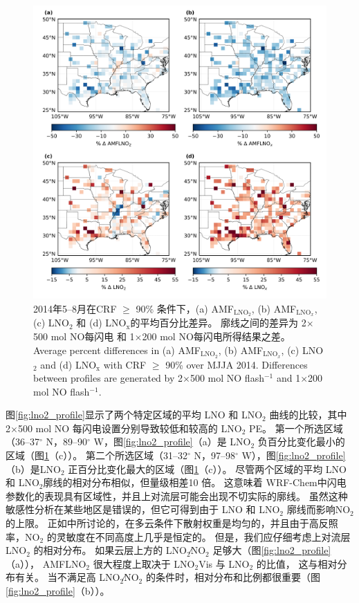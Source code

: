 \begin{figure}[t]
\centering
\includegraphics[width=13cm]{./figures/simulation_diff.png}
\caption{2014年5--8月在CRF $\geq$ 90\% 条件下，(a) AMF$_{\textrm{LNO$_2$}}$, (b) AMF$_{\textrm{LNO$_x$}}$, (c) LNO$_\textrm{2}$ 和 (d) LNO$_\textrm{x}$的平均百分比差异。
廓线之间的差异为 2$\times$500 mol NO每闪电 和 1$\times$200 mol NO每闪电所得结果之差。\\
Average percent differences in (a) AMF$_{\textrm{LNO$_2$}}$, (b) AMF$_{\textrm{LNO$_x$}}$, (c) LNO$_\textrm{2}$ and (d) LNO$_\textrm{x}$ with CRF $\geq$ 90\% over MJJA 2014.
Differences between profiles are generated by 2$\times$500 mol NO flash$^{-1}$ and 1$\times$200 mol NO flash$^{-1}$.}
\label{fig:simulation_diff}
\end{figure}

图\ref{fig:lno2_profile}显示了两个特定区域的平均 LNO 和 LNO$_2$ 曲线的比较，其中 2$\times$500 mol NO 每闪电设置分别导致较低和较高的 LNO$_2$ PE。
第一个所选区域（36--37$^{\circ}$ N，89--90$^{\circ}$ W，图\ref{fig:lno2_profile}（a）是 LNO$_2$ 负百分比变化最小的区域（图\ref{fig:simulation_diff}（c））。
第二个所选区域（31--32$^{\circ}$ N，97--98$^{\circ}$ W），图\ref{fig:lno2_profile}（b）是LNO$_2$ 正百分比变化最大的区域（图\ref{fig:simulation_diff}（c））。
尽管两个区域的平均 LNO 和 LNO$_2$廓线的相对分布相似，但量级相差10 倍。
这意味着 WRF-Chem中闪电参数化的表现具有区域性，并且上对流层可能会出现不切实际的廓线。
虽然这种敏感性分析在某些地区是错误的，但它可得到由于 LNO 和 LNO$_2$ 廓线而影响NO$_2$的上限。
正如\citet{Laughner.2017}中所讨论的，在多云条件下散射权重是均匀的，并且由于高反照率，NO$_2$ 的灵敏度在不同高度上几乎是恒定的。
但是，我们应仔细考虑上对流层LNO$_2$ 的相对分布。
如果云层上方的 LNO$_2$∕NO$_2$ 足够大（图\ref{fig:lno2_profile}（a）），
AMFLNO$_2$ 很大程度上取决于 LNO$_2$Vis 与 LNO$_2$ 的比值，
这与相对分布有关。
当不满足高 LNO$_2$∕NO$_2$ 的条件时，相对分布和比例都很重要（图\ref{fig:lno2_profile}（b））。

